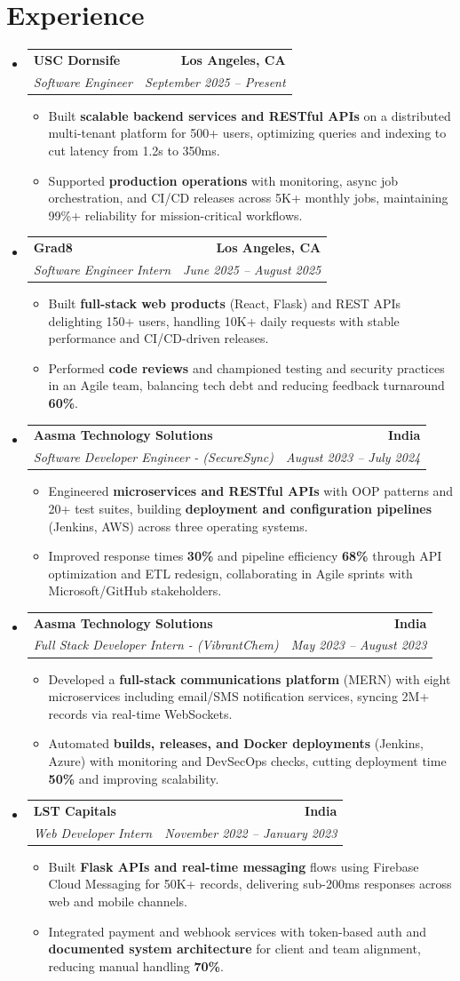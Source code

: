 \documentclass[letterpaper,10pt]{article}
\makeatletter
\newcommand{\resumeItem}[1]{\item\small{{#1 \vspace{-2pt}}}}
\newcommand{\resumeSubheading}[4]{\vspace{-1pt}\item\begin{tabular*}{1.0\textwidth}[t]{l@{\extracolsep{\fill}}r}\textbf{#1} & \textbf{\small #2} \\\textit{\small#3} & \textit{\small #4} \\\end{tabular*}\vspace{-2pt}}
\newcommand{\resumeSubHeadingListStart}{\begin{itemize}[leftmargin=0.0in, label={}]}
\newcommand{\resumeSubHeadingListEnd}{\end{itemize}}
\newcommand{\resumeItemListStart}{\begin{itemize}[leftmargin=0.15in,label=\textbullet,itemsep=2pt,topsep=0pt,parsep=0pt,partopsep=0pt]}
\newcommand{\resumeItemListEnd}{\end{itemize}\vspace{-4pt}}
\makeatother
\begin{document}
\section{Experience}
\resumeSubHeadingListStart
\resumeSubheading{USC Dornsife}{Los Angeles, CA}{Software Engineer}{September 2025 -- Present}
\resumeItemListStart
\resumeItem{Built \textbf{scalable backend services and RESTful APIs} on a distributed multi-tenant platform for 500+ users, optimizing queries and indexing to cut latency from 1.2s to 350ms.}
\resumeItem{Supported \textbf{production operations} with monitoring, async job orchestration, and CI/CD releases across 5K+ monthly jobs, maintaining 99\%+ reliability for mission-critical workflows.}
\resumeItemListEnd
\resumeSubheading{Grad8}{Los Angeles, CA}{Software Engineer Intern}{June 2025 -- August 2025}
\resumeItemListStart
\resumeItem{Built \textbf{full-stack web products} (React, Flask) and REST APIs delighting 150+ users, handling 10K+ daily requests with stable performance and CI/CD-driven releases.}
\resumeItem{Performed \textbf{code reviews} and championed testing and security practices in an Agile team, balancing tech debt and reducing feedback turnaround \textbf{60\%}.}
\resumeItemListEnd
\resumeSubheading{Aasma Technology Solutions}{India}{Software Developer Engineer - (SecureSync)}{August 2023 -- July 2024}
\resumeItemListStart
\resumeItem{Engineered \textbf{microservices and RESTful APIs} with OOP patterns and 20+ test suites, building \textbf{deployment and configuration pipelines} (Jenkins, AWS) across three operating systems.}
\resumeItem{Improved response times \textbf{30\%} and pipeline efficiency \textbf{68\%} through API optimization and ETL redesign, collaborating in Agile sprints with Microsoft/GitHub stakeholders.}
\resumeItemListEnd
\resumeSubheading{Aasma Technology Solutions}{India}{Full Stack Developer Intern - (VibrantChem)}{May 2023 -- August 2023}
\resumeItemListStart
\resumeItem{Developed a \textbf{full-stack communications platform} (MERN) with eight microservices including email/SMS notification services, syncing 2M+ records via real-time WebSockets.}
\resumeItem{Automated \textbf{builds, releases, and Docker deployments} (Jenkins, Azure) with monitoring and DevSecOps checks, cutting deployment time \textbf{50\%} and improving scalability.}
\resumeItemListEnd
\resumeSubheading{LST Capitals}{India}{Web Developer Intern}{November 2022 -- January 2023}
\resumeItemListStart
\resumeItem{Built \textbf{Flask APIs and real-time messaging} flows using Firebase Cloud Messaging for 50K+ records, delivering sub-200ms responses across web and mobile channels.}
\resumeItem{Integrated payment and webhook services with token-based auth and \textbf{documented system architecture} for client and team alignment, reducing manual handling \textbf{70\%}.}
\resumeItemListEnd
\resumeSubHeadingListEnd
\vspace{-6pt}
\end{document}
